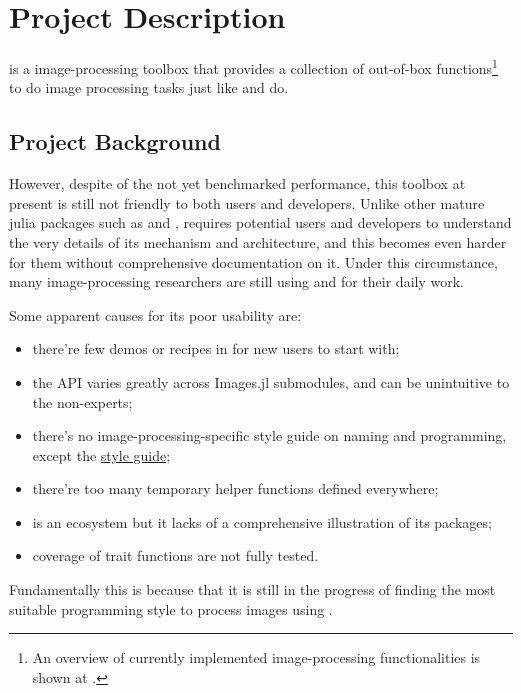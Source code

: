
\section{Project Description}\label{sec:project}

\repoimages{} is a \langjulia image-processing toolbox that provides a collection of out-of-box functions\footnote{An overview of currently implemented image-processing functionalities is shown at \apicomparison.} to do image processing tasks just like \reposcikitimage{} and \matlabimageprocessing{} do.

\subsection*{Project Background}

However, despite of the not yet benchmarked performance, this toolbox at present is still not friendly to both users and developers. Unlike other mature julia packages such as \repojump and \repogpuarrays, \images{} requires potential users and developers to understand the very details of its mechanism and architecture, and this becomes even harder for them without comprehensive documentation on it. Under this circumstance, many image-processing researchers are still using \langpython and \langmatlab for their daily work.

Some apparent causes for its poor usability are:
\begin{itemize}
    \item there're few demos or recipes in \images{} for new users to start with;
    \item the API varies greatly across Images.jl submodules, and can be unintuitive to the non-experts;
    \item there's no image-processing-specific style guide on naming and programming, except the \langjulia{} \href{https://docs.julialang.org/en/v1/manual/style-guide/}{style guide};
    \item there're too many temporary helper functions defined everywhere;
    \item \images{} is an ecosystem but it lacks of a comprehensive illustration of its packages;
    \item coverage of trait functions are not fully tested.
\end{itemize}
Fundamentally this is because that it is still in the progress of finding the most suitable programming style to process images using \langjulia.

